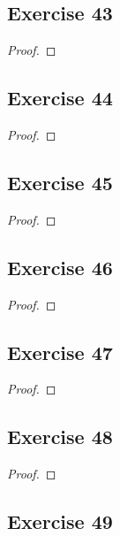 \documentclass[14pt]{extarticle}
\begin{document}
\subsection{Exercise 43}

\begin{proof}

\end{proof}

\subsection{Exercise 44}

\begin{proof}

\end{proof}

\subsection{Exercise 45}

\begin{proof}

\end{proof}

\subsection{Exercise 46}

\begin{proof}

\end{proof}

\subsection{Exercise 47}

\begin{proof}

\end{proof}

\subsection{Exercise 48}

\begin{proof}

\end{proof}

\subsection{Exercise 49}
\end{document}
